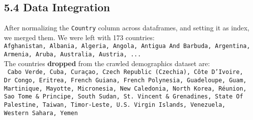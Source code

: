 \documentclass[14pt]{extarticle}
\begin{document}
\subsection*{5.4 Data Integration}
After normalizing the \texttt{Country} column across dataframes, and setting it as index, we merged them.
We were left with 173 countries:\\
\texttt{Afghanistan, Albania, Algeria, Angola, Antigua And Barbuda, Argentina, Armenia, Aruba, Australia, Austria, ...}\\
The countries \textbf{dropped} from the crawled demographics dataset are:\\
\texttt{
Cabo Verde,
Cuba,
Curaçao,
Czech Republic (Czechia),
Côte D'Ivoire,
Dr Congo,
Eritrea,
French Guiana,
French Polynesia,
Guadeloupe,
Guam,
Martinique,
Mayotte,
Micronesia,
New Caledonia,
North Korea,
Réunion,
Sao Tome \& Principe,
South Sudan,
St. Vincent \& Grenadines,
State Of Palestine,
Taiwan,
Timor-Leste,
U.S. Virgin Islands,
Venezuela,
Western Sahara,
Yemen
}
\end{document}

